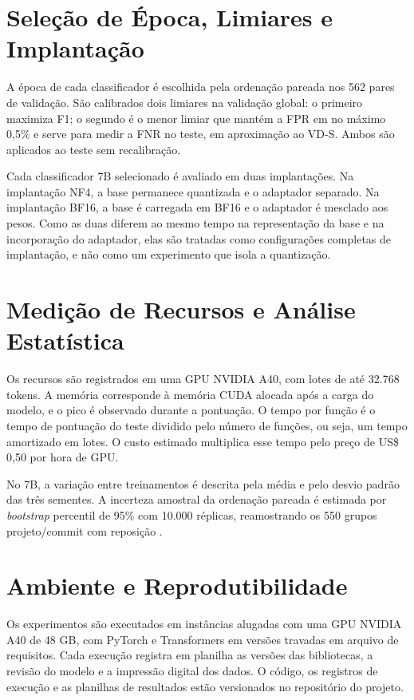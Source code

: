 \section{Seleção de Época, Limiares e Implantação}

A época de cada classificador é escolhida pela ordenação pareada nos 562 pares de validação. São calibrados dois limiares na validação global: o primeiro maximiza F1; o segundo é o menor limiar que mantém a FPR em no máximo 0,5\% e serve para medir a FNR no teste, em aproximação ao VD-S. Ambos são aplicados ao teste sem recalibração.

Cada classificador 7B selecionado é avaliado em duas implantações. Na implantação NF4, a base permanece quantizada e o adaptador separado. Na implantação BF16, a base é carregada em BF16 e o adaptador é mesclado aos pesos. Como as duas diferem ao mesmo tempo na representação da base e na incorporação do adaptador, elas são tratadas como configurações completas de implantação, e não como um experimento que isola a quantização.

\section{Medição de Recursos e Análise Estatística}

Os recursos são registrados em uma GPU NVIDIA A40, com lotes de até 32.768 tokens. A memória corresponde à memória CUDA alocada após a carga do modelo, e o pico é observado durante a pontuação. O tempo por função é o tempo de pontuação do teste dividido pelo número de funções, ou seja, um tempo amortizado em lotes. O custo estimado multiplica esse tempo pelo preço de US\$ 0,50 por hora de GPU.

No 7B, a variação entre treinamentos é descrita pela média e pelo desvio padrão das três sementes. A incerteza amostral da ordenação pareada é estimada por \textit{bootstrap} percentil de 95\% com 10.000 réplicas, reamostrando os 550 grupos projeto/commit com reposição \cite{field2007bootstrap}.

\section{Ambiente e Reprodutibilidade}

Os experimentos são executados em instâncias alugadas com uma GPU NVIDIA A40 de 48 GB, com PyTorch e Transformers em versões travadas em arquivo de requisitos. Cada execução registra em planilha as versões das bibliotecas, a revisão do modelo e a impressão digital dos dados. O código, os registros de execução e as planilhas de resultados estão versionados no repositório do projeto.
